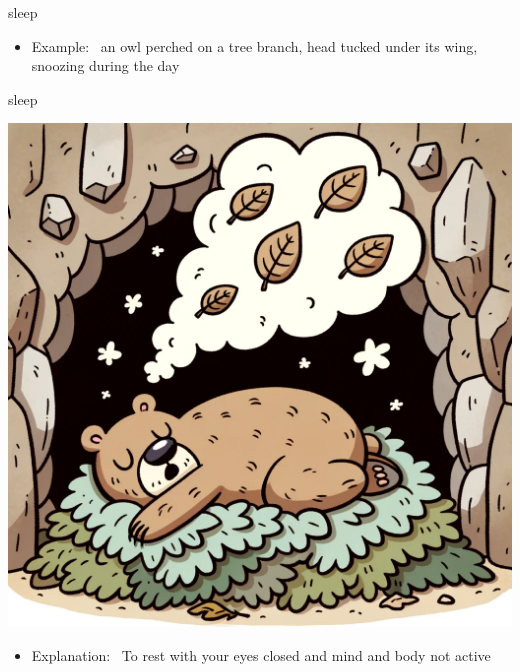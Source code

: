 \documentclass[avery5371, grid,frame]{flashcards}
\begin{document}
\begin{flashcard}{sleep}
\begin{center}
\begin{minipage}[c]{.45\textwidth}
\begin{itemize}
            \item Example: \ an owl perched on a tree branch, head tucked under its wing, snoozing during the day
            \end{itemize}
        \end{minipage}
    \end{center}
    \vspace*{\fill}
\end{flashcard}\begin{flashcard}{sleep}
    \vspace*{\fill}
    \begin{center}
        \begin{minipage}[c]{.45\textwidth}
            \includegraphics[width=\textwidth]{cards/s/sleep/sleep - a bear hibernating in a cave, surrounded by a pile of leaves, breathing slowly and deeply in slumber.png}
        \end{minipage}
        \begin{minipage}[c]{.45\textwidth}
            \begin{itemize}\setlength\itemsep{12pt}
            \item Explanation: \ To rest with your eyes closed and mind and body not active


\end{itemize}
\end{minipage}
\end{center}
\end{flashcard}
\end{document}
